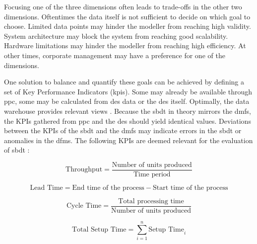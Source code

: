 Focusing one of the three dimensions often leads to trade-offs in the other two dimensions. Oftentimes the data itself is not sufficient to decide on which goal to choose. Limited data points may hinder the modeller from reaching high validity. System architecture may block the system from reaching good scalability. Hardware limitations may hinder the modeller from reaching high efficiency.
At other times, corporate management may have a preference for one of the dimensions.

One solution to balance and quantify these goals can be achieved by defining a set of Key Performance Indicators (\gls{kpi}s). Some may already be available through \gls{ppc}, some may be calculated from \gls{des} data or the \gls{des} itself. Optimally, the data warehouse provides relevant views \autocite{cui2020manufacturing}. Because the \gls{sbdt} in theory mirrors the \gls{dmfs}, the KPIs gathered from \gls{ppc} and the \gls{des} should yield identical values. Deviations between the KPIs of the \gls{sbdt} and the \gls{dmfs} may indicate errors in the \gls{sbdt} or anomalies in the \gls{dfms}. The following KPIs are deemed relevant for the evaluation of \gls{sbdt} \autocite{friederich2023framework}:

\begin{equation}
  \text{Throughput} = \frac{\text{Number of units produced}}{\text{Time period}}
  \label{eq:throughput}
\end{equation}

\begin{equation}
  \text{Lead Time} = \text{End time of the process} - \text{Start time of the process}
  \label{eq:lead_time}
\end{equation}

\begin{equation}
  \text{Cycle Time} = \frac{\text{Total processing time}}{\text{Number of units produced}}
  \label{eq:cycle_time}
\end{equation}

\begin{equation}
  \text{Total Setup Time} = \sum_{i=1}^{n} \text{Setup Time}_i
  \label{eq:setup_time}
\end{equation}

